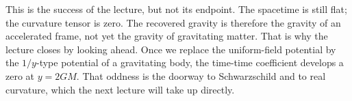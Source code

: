This is the success of the lecture, but not its endpoint. The spacetime is still flat; the curvature tensor is zero. The recovered gravity is therefore the gravity of an accelerated frame, not yet the gravity of gravitating matter. That is why the lecture closes by looking ahead. Once we replace the uniform-field potential by the \(1/y\)-type potential of a gravitating body, the time-time coefficient develops a zero at \(y=2GM\). That oddness is the doorway to Schwarzschild and to real curvature, which the next lecture will take up directly.